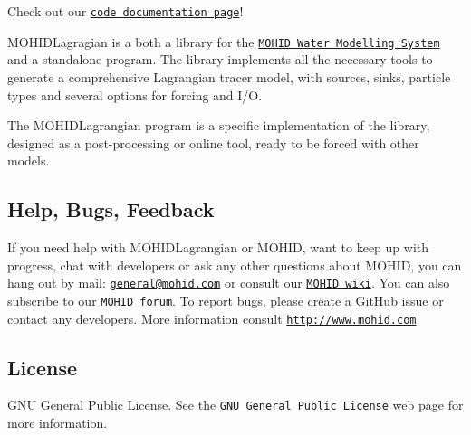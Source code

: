 Check out our \href{https://rbcanelas.github.io/MOHID-Lagrangian/}{\tt code documentation page}!

M\+O\+H\+I\+D\+Lagragian is a both a library for the \href{http://www.mohid.com}{\tt M\+O\+H\+ID Water Modelling System} and a standalone program. The library implements all the necessary tools to generate a comprehensive Lagrangian tracer model, with sources, sinks, particle types and several options for forcing and I/O.

The M\+O\+H\+I\+D\+Lagrangian program is a specific implementation of the library, designed as a post-\/processing or online tool, ready to be forced with other models.

\subsection*{Help, Bugs, Feedback}

If you need help with M\+O\+H\+I\+D\+Lagrangian or M\+O\+H\+ID, want to keep up with progress, chat with developers or ask any other questions about M\+O\+H\+ID, you can hang out by mail\+: \href{mailto:general@mohid.com}{\tt general@mohid.\+com} or consult our \href{http://wiki.mohid.com}{\tt M\+O\+H\+ID wiki}. You can also subscribe to our \href{http://forum.mohid.com}{\tt M\+O\+H\+ID forum}. To report bugs, please create a Git\+Hub issue or contact any developers. More information consult \href{http://www.mohid.com}{\tt http\+://www.\+mohid.\+com}

\subsection*{License}

G\+NU General Public License. See the \href{http://www.gnu.org/copyleft/gpl.html}{\tt G\+NU General Public License} web page for more information. 